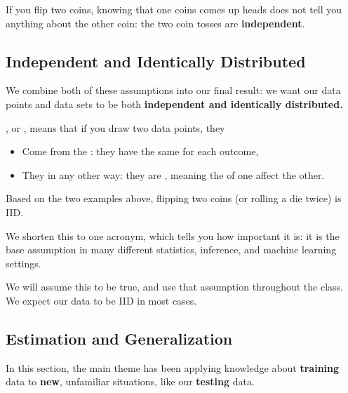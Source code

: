         \miniex If you flip two coins, knowing that one coins comes up heads does not tell you anything about the other coin: the two coin tosses are \textbf{independent}.
        
    \subsection{Independent and Identically Distributed}
    
        We combine both of these assumptions into our final result: we want our data points and data sets to be both \textbf{independent and identically distributed.}\\
        
        \begin{definition}
            , or , means that if you draw two data points, they
            
            \begin{itemize}
                \item Come from the  : they have the same  for each outcome,
                \item They  in any other way: they are , meaning the  of one  affect the other.
            \end{itemize}
        \end{definition}
        
        \miniex Based on the two examples above, flipping two coins (or rolling a die twice) is IID.
            
        We shorten this to one acronym, which tells you how important it is: it is the base assumption in many different statistics, inference, and machine learning settings.
        
        We will assume this to be true, and use that assumption throughout the class. We expect our data to be IID in most cases.
        
    \subsection{Estimation and Generalization}
    
        In this section, the main theme has been applying knowledge about \textbf{training} data to \textbf{new}, unfamiliar situations, like our \textbf{testing} data. 
        
